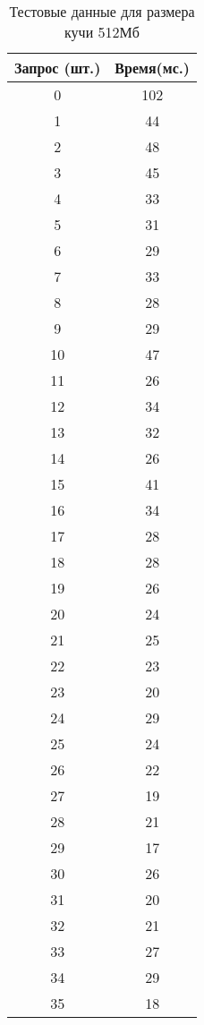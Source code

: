 \begin{table}[H]
	\begin{minipage}{.4\textwidth}
		\centering
		\caption{Тестовые данные для размера кучи 512Мб}
		\begin{tabular}{|c|c|}
			\hline
			Запрос (шт.) & Время(мс.) \\
			\hline
			0   & 102 \\
			1   & 44  \\
			2   & 48  \\
			3   & 45  \\
			4   & 33  \\
			5   & 31  \\
			6   & 29  \\
			7   & 33  \\
			8   & 28  \\
			9   & 29  \\
			10  & 47  \\
			11  & 26  \\
			12  & 34  \\
			13  & 32  \\
			14  & 26  \\
			15  & 41  \\
			16  & 34  \\
			17  & 28  \\
			18  & 28  \\
			19  & 26  \\
			20  & 24  \\
			21  & 25  \\
			22  & 23  \\
			23  & 20  \\
			24  & 29  \\
			25  & 24  \\
			26  & 22  \\
			27  & 19  \\
			28  & 21  \\
			29  & 17  \\
			30  & 26  \\
			31  & 20  \\
			32  & 21  \\
			33  & 27  \\
			34  & 29  \\
			35  & 18  \\
			\hline
		\end{tabular}
	\end{minipage}
	\hfill
	\begin{minipage}{.4\textwidth}
		\centering
		\caption{Тестовые данные для размера кучи 512Мб}

\end{minipage}
\end{table}
